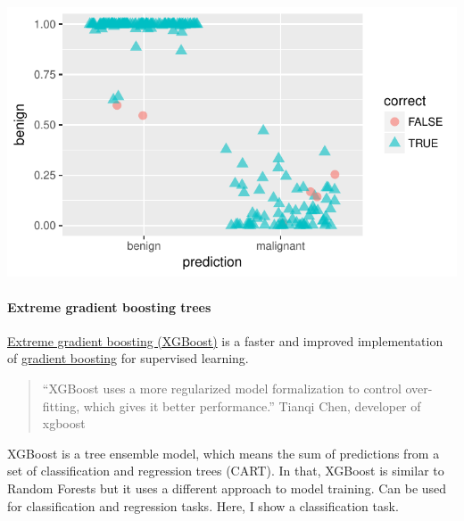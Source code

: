 \documentclass[]{article}
\let\oldparagraph\paragraph
\renewcommand{\paragraph}[1]{\oldparagraph{#1}\mbox{}}
\begin{document}
\begin{center}\includegraphics{webinar_code_files/figure-latex/results_jitter_rf-1} \end{center}

\paragraph{Extreme gradient boosting
trees}\label{extreme-gradient-boosting-trees}

\href{http://xgboost.readthedocs.io/en/latest/model.html}{Extreme
gradient boosting (XGBoost)} is a faster and improved implementation of
\href{https://en.wikipedia.org/wiki/Gradient_boosting}{gradient
boosting} for supervised learning.

\begin{quote}
``XGBoost uses a more regularized model formalization to control
over-fitting, which gives it better performance.'' Tianqi Chen,
developer of xgboost
\end{quote}

XGBoost is a tree ensemble model, which means the sum of predictions
from a set of classification and regression trees (CART). In that,
XGBoost is similar to Random Forests but it uses a different approach to
model training. Can be used for classification and regression tasks.
Here, I show a classification task.
\end{document}
